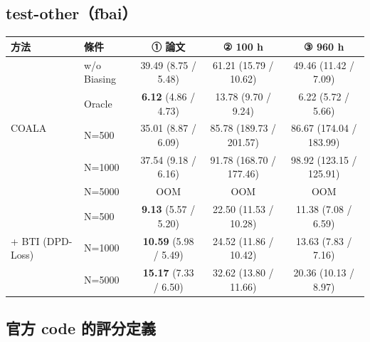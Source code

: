 \documentclass[11pt,a4paper]{article}
\begin{document}
\subsection*{test-other（fbai）}

\begin{center}
{\small
\begin{tabular}{llccc}
\toprule
\textbf{方法} & \textbf{條件} & \textbf{① 論文} & \textbf{② 100 h} & \textbf{③ 960 h} \\
\midrule
\multirow{5}{*}{COALA}
 & w/o Biasing & 39.49 (8.75 / 5.48) & 61.21 (15.79 / 10.62) & 49.46 (11.42 / 7.09) \\
 & Oracle      & \textbf{6.12} (4.86 / 4.73) & 13.78 (9.70 / 9.24) & 6.22 (5.72 / 5.66) \\
 & N=500       & 35.01 (8.87 / 6.09) & 85.78 (189.73 / 201.57) & 86.67 (174.04 / 183.99) \\
 & N=1000      & 37.54 (9.18 / 6.16) & 91.78 (168.70 / 177.46) & 98.92 (123.15 / 125.91) \\
 & N=5000      & OOM & OOM & OOM \\
\midrule
\multirow{3}{*}{+ BTI (DPD-Loss)}
 & N=500       & \textbf{9.13} (5.57 / 5.20) & 22.50 (11.53 / 10.28) & 11.38 (7.08 / 6.59) \\
 & N=1000      & \textbf{10.59} (5.98 / 5.49) & 24.52 (11.86 / 10.42) & 13.63 (7.83 / 7.16) \\
 & N=5000      & \textbf{15.17} (7.33 / 6.50) & 32.62 (13.80 / 11.66) & 20.36 (10.13 / 8.97) \\
\bottomrule
\end{tabular}
}
\end{center}

\subsection*{官方 code 的評分定義}
\end{document}
